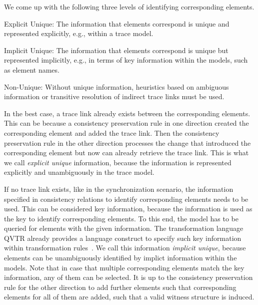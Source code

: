 We come up with the following three levels of identifying corresponding elements.
\begin{properdescription}
    \item[Explicit Unique:] The information that elements correspond is unique and represented explicitly, e.g., within a trace model.
    \item[Implicit Unique:] The information that elements correspond is unique but represented implicitly, e.g., in terms of key information within the models, such as element names.
    \item[Non-Unique:] Without unique information, heuristics based on ambiguous information or transitive resolution of indirect trace links must be used.
\end{properdescription}

In the best case, a trace link already exists between the corresponding elements. This can be because a consistency preservation rule in one direction created the corresponding element and added the trace link. Then the consistency preservation rule in the other direction processes the change that introduced the corresponding element but now can already retrieve the trace link.
This is what we call \emph{explicit unique} information, because the information is represented explicitly and unambiguously in the trace model.

If no trace link exists, like in the synchronization scenario, the information specified in consistency relations to identify corresponding elements needs to be used.
This can be considered key information, because the information is used as the key to identify corresponding elements.
To this end, the model has to be queried for elements with the given information.
The transformation language \gls{QVTR} already provides a language construct to specify such key information within transformation rules~\cite[Sec.~7.10.2.]{qvt}.
We call this information \emph{implicit unique}, because elements can be unambiguously identified by implict information within the models.
Note that in case that multiple corresponding elements match the key information, any of them can be selected.
It is up to the consistency preservation rule for the other direction to add further elements such that corresponding elements for all of them are added, such that a valid witness structure is induced.

